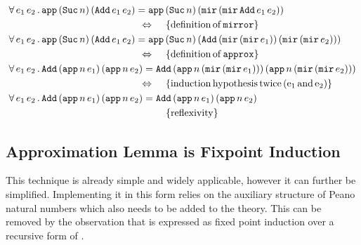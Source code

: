 \newcommand{\Adds}[2]{\hs{Add} \, #1 e_1 #2 \, #1 e_2 #2}
\newcommand{\Approxn}[0]{\hs{app} \, n \,}
\newcommand{\ApproxSucn}[0]{\hs{app} \, (\hs{Suc} \, n) \,}
\newcommand{\mirmir}[0]{\hs{mir} \, (\hs{mir} \, }
\begin{align*}
\faa{e_1}{e_2}&  \ApproxSucn (\Adds{}{})  = \ApproxSucn (\mirmir \Adds{}{} ))                                                                   \\
                                                                                 \desclra{\defof{\hs{mirror}}}                                   \\
\faa{e_1}{e_2}&  \ApproxSucn (\Adds{}{})  = \ApproxSucn (\Adds{(\mirmir}{))})                                                                    \\
                                                                                \desclra{\defof{\hs{approx}}}                                    \\
\faa{e_1}{e_2}&  \Adds{(\Approxn}{)}      = \Adds{(\Approxn(\mirmir}{)))}                                                                        \\
                                                                                \desclra{induction \, hypothesis \, twice \, (e_1 \, and \, e_2)} \\
\faa{e_1}{e_2}&  \Adds{(\Approxn}{)}      = \Adds{(\Approxn}{)}                                                                                  \\
                                                                                \desca{reflexivity}                                              \\
\end{align*}

\subsection{Approximation Lemma is Fixpoint Induction}

This technique is already simple and widely applicable, however it can
further be simplified. Implementing it in this form relies on the
auxiliary structure of Peano natural numbers which also needs to be
added to the theory. This can be removed by the observation that is
expressed as fixed point induction over a recursive form of .

